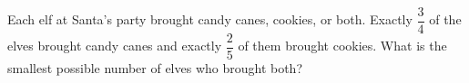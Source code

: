 Each elf at Santa's party brought candy canes, cookies, or both. Exactly $\dfrac{3}{4}$ of the elves brought candy canes and exactly $\dfrac{2}{5}$ of them brought cookies. What is the smallest possible number of elves who brought both?

